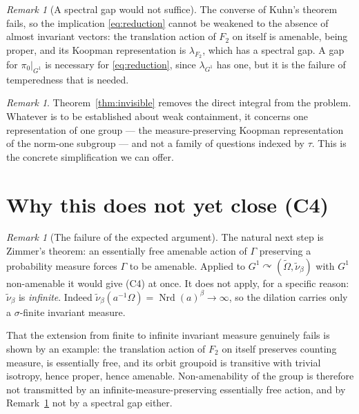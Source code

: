 \documentclass[11pt]{amsart}
\numberwithin{equation}{section}
\theoremstyle{definition}
\theoremstyle{remark}
\newtheorem{remark}[theorem]{Remark}
\newcommand{\Nrd}{\operatorname{Nrd}}
\begin{document}
\begin{remark}[A spectral gap would not suffice]\label{rem:nogap}
The converse of Kuhn's theorem fails, so the implication \eqref{eq:reduction} cannot be
weakened to the absence of almost invariant vectors: the translation action of $F_2$ on itself
is amenable, being proper, and its Koopman representation is $\lambda_{F_2}$, which has a
spectral gap. A gap for $\pi_0|_{G^1}$ is necessary for \eqref{eq:reduction}, since
$\lambda_{G^1}$ has one, but it is the failure of temperedness that is needed.
\end{remark}

\begin{remark}\label{rem:onerep}
Theorem~\ref{thm:invisible} removes the direct integral from the problem. Whatever is to be
established about weak containment, it concerns one representation of one group --- the
measure-preserving Koopman representation of the norm-one subgroup --- and not a family of
questions indexed by $\tau$. This is the concrete simplification we can offer.
\end{remark}

\section{Why this does not yet close (C4)}

\begin{remark}[The failure of the expected argument]\label{rem:zimmer}
The natural next step is Zimmer's theorem: an essentially free amenable action of $\Gamma$
preserving a probability measure forces $\Gamma$ to be amenable. Applied to
$G^1\curvearrowright(\widetilde\Omega,\tilde\nu_\beta)$ with $G^1$ non-amenable it would give
(C4) at once. It does not apply, for a specific reason: $\tilde\nu_\beta$ is
\emph{infinite}. Indeed $\tilde\nu_\beta(a^{-1}\Omega)=\Nrd(a)^{\beta}\to\infty$, so the
dilation carries only a $\sigma$-finite invariant measure.

That the extension from finite to infinite invariant measure genuinely fails is shown by an
example: the translation action of $F_2$ on itself preserves counting measure, is essentially
free, and its orbit groupoid is transitive with trivial isotropy, hence proper, hence
amenable. Non-amenability of the group is therefore not transmitted by an
infinite-measure-preserving essentially free action, and by Remark~\ref{rem:nogap} not by a
spectral gap either.
\end{remark}
\end{document}
